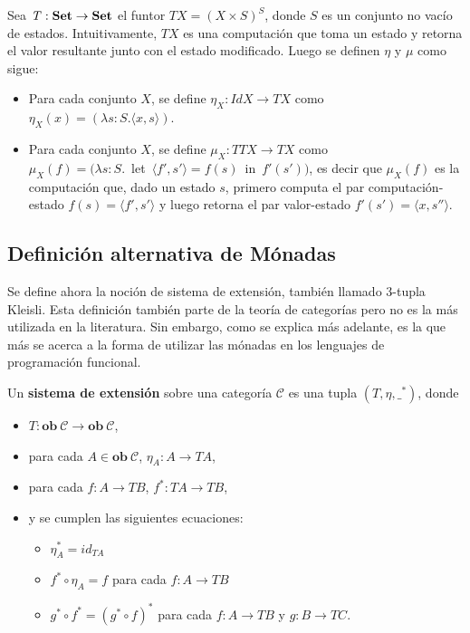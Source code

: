 \begin{ejemplo}
Sea $\mathit{T} : \text{\bf Set} \rightarrow \text{\bf Set}$ el funtor $\mathit{T} X = (X \times S)^S$, donde $S$ es un conjunto no vacío de estados. Intuitivamente, $\mathit{T} X$ es una computación que toma un estado y retorna el valor resultante junto con el estado modificado. Luego se definen $\eta$ y $\mu$ como sigue:
\begin{itemize}[noitemsep, label=$\blacktriangleright$]
	\item Para cada conjunto $X$, se define $\eta_X : \mathit{Id} X \rightarrow \mathit{T} X$ como $\eta_X (x) = (\lambda s : S . \langle x , s \rangle)$.
	\item Para cada conjunto $X$, se define $\mu_X : \mathit{T T} X \rightarrow \mathit{T} X$ como \\ \mbox{$\mu_X (f) = (\lambda s : S .$ let $\langle f' , s' \rangle = f(s)$ in $f'(s'))$}, es decir que $\mu_X (f)$ es la computación que, dado un estado $s$, primero computa el par computación-estado $f(s) = \langle f' , s' \rangle$ y luego retorna el par valor-estado $f'(s') = \langle x , s'' \rangle$.   
\end{itemize}
\end{ejemplo}

\subsection{Definición alternativa de Mónadas}\label{monadas:alt}

Se define ahora la noción de sistema de extensión, también llamado 3-tupla Kleisli. Esta definición también parte de la teoría de categorías pero no es la más utilizada en la literatura. Sin embargo, como se explica más adelante, es la que más se acerca a la forma de utilizar las mónadas en los lenguajes de programación funcional. 

\begin{definition}
Un \textbf{sistema de extensión} sobre una categoría $\mathscr{C}$ es una tupla $(\mathit{T},\eta,\_^*)$, donde 
\begin{itemize}[noitemsep,label=$\blacktriangleright$]
	\item $\mathit{T} : \mathbf{ob} \ \mathscr{C} \rightarrow \mathbf{ob} \ \mathscr{C}$,
	\item para cada $A \in \mathbf{ob} \ \mathscr{C}$, $\eta_A : A \rightarrow \mathit{T}A$,
	\item para cada $f : A \rightarrow \mathit{T}B$,  $f^* : \mathit{T}A \rightarrow \mathit{T}B$,
	\item y se cumplen las siguientes ecuaciones:
	\begin{itemize}[noitemsep,label=$\bullet$]
		\item $\eta^*_A = id_{\mathit{T}A}$
		\item $f^* \circ \eta_A = f$ para cada $f : A \rightarrow \mathit{T}B$
		\item $g^* \circ f^* = (g^* \circ f)^*$ para cada $f : A \rightarrow \mathit{T}B$ y $g : B \rightarrow \mathit{T}C$.
	\end{itemize}
\end{itemize}
\end{definition}

